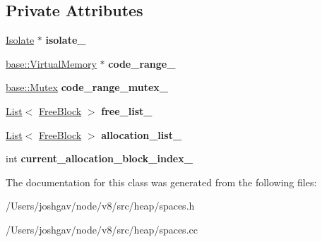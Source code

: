 \subsection*{Private Attributes}
\begin{DoxyCompactItemize}
\item 
\hyperlink{classv8_1_1internal_1_1_isolate}{Isolate} $\ast$ {\bfseries isolate\+\_\+}\hypertarget{classv8_1_1internal_1_1_code_range_a955b7b8eb2f5c91db57b3d0e46b45e05}{}\label{classv8_1_1internal_1_1_code_range_a955b7b8eb2f5c91db57b3d0e46b45e05}

\item 
\hyperlink{classv8_1_1base_1_1_virtual_memory}{base\+::\+Virtual\+Memory} $\ast$ {\bfseries code\+\_\+range\+\_\+}\hypertarget{classv8_1_1internal_1_1_code_range_a152a11786099e79390a14b05b6dd4780}{}\label{classv8_1_1internal_1_1_code_range_a152a11786099e79390a14b05b6dd4780}

\item 
\hyperlink{classv8_1_1base_1_1_mutex}{base\+::\+Mutex} {\bfseries code\+\_\+range\+\_\+mutex\+\_\+}\hypertarget{classv8_1_1internal_1_1_code_range_aa83cb77c2be0f9b9042f067e36df29b3}{}\label{classv8_1_1internal_1_1_code_range_aa83cb77c2be0f9b9042f067e36df29b3}

\item 
\hyperlink{classv8_1_1internal_1_1_list}{List}$<$ \hyperlink{classv8_1_1internal_1_1_code_range_1_1_free_block}{Free\+Block} $>$ {\bfseries free\+\_\+list\+\_\+}\hypertarget{classv8_1_1internal_1_1_code_range_ab386ade291987b66669acd60c82e3d88}{}\label{classv8_1_1internal_1_1_code_range_ab386ade291987b66669acd60c82e3d88}

\item 
\hyperlink{classv8_1_1internal_1_1_list}{List}$<$ \hyperlink{classv8_1_1internal_1_1_code_range_1_1_free_block}{Free\+Block} $>$ {\bfseries allocation\+\_\+list\+\_\+}\hypertarget{classv8_1_1internal_1_1_code_range_a70689cc4730d0e73a89a63b4980f3ad4}{}\label{classv8_1_1internal_1_1_code_range_a70689cc4730d0e73a89a63b4980f3ad4}

\item 
int {\bfseries current\+\_\+allocation\+\_\+block\+\_\+index\+\_\+}\hypertarget{classv8_1_1internal_1_1_code_range_a0fb4f845674ba4ba549aba71dcc96b66}{}\label{classv8_1_1internal_1_1_code_range_a0fb4f845674ba4ba549aba71dcc96b66}

\end{DoxyCompactItemize}


The documentation for this class was generated from the following files\+:\begin{DoxyCompactItemize}
\item 
/\+Users/joshgav/node/v8/src/heap/spaces.\+h\item 
/\+Users/joshgav/node/v8/src/heap/spaces.\+cc\end{DoxyCompactItemize}
